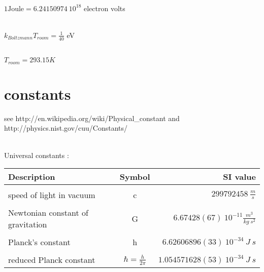 \documentclass[12pt]{article}  %
\begin{document}
\ \\

$1 \text{Joule} = 6.24150974 \ 10^{18}$ electron volts

\ \\
$k_{Boltzmann} T_{room} = \frac{1}{40}$ eV

\ \\
$T_{room} = 293.15 K$

\section{constants}

see http://en.wikipedia.org/wiki/Physical\_constant and  http://physics.nist.gov/cuu/Constants/

\ \\

Universal constants : \\

\begin{tabular}{lcr}
Description                       & Symbol                  & SI value \\
\hline
\\[0.1pt]
speed of light in vacuum          & c                       & $299 792 458 \ \frac{m}{s}$ \\
\\[0.1pt]
Newtonian constant of gravitation & G                       & $6.67428(67) \ 10^{−11} \frac{m^3}{kg \ s^2}$ \\
\\[0.1pt]
Planck's constant                 & h                       & $6.626 068 96(33) \ 10^{−34} \  J \ s$ \\
\\[0.1pt]
reduced Planck constant           & $\hbar = \frac{h}{2 \pi}$ & $1.054 571 628(53) \ 10^{−34} \ J \ s$ \\
\end{tabular}

\ \\ 
\end{document}
